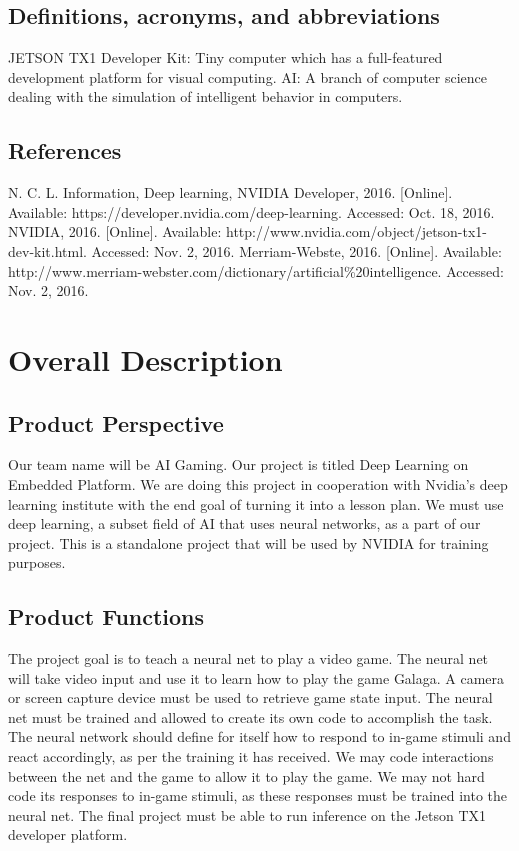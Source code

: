 \documentclass{scrreprt}
\begin{document}
\section{Definitions, acronyms, and abbreviations}
JETSON TX1 Developer Kit: Tiny computer which has a full-featured development platform for visual computing.\newline
AI: A branch of computer science dealing with the simulation of intelligent behavior in computers.\newline

\section{References}
N. C. L. Information, Deep learning, NVIDIA Developer, 2016. [Online]. Available: https://developer.nvidia.com/deep-learning. Accessed: Oct. 18, 2016.\newline
NVIDIA, 2016. [Online]. Available: http://www.nvidia.com/object/jetson-tx1-dev-kit.html. Accessed: Nov. 2, 2016.\newline
Merriam-Webste, 2016. [Online]. Available: http://www.merriam-webster.com/dictionary/artificial\%20intelligence. Accessed: Nov. 2, 2016.

\chapter{Overall Description}

\section{Product Perspective}
Our team name will be AI Gaming.
Our project is titled Deep Learning on Embedded Platform.
We are doing this project in cooperation with Nvidia's deep learning institute with the end goal of turning it into a lesson plan.
We must use deep learning, a subset field of AI that uses neural networks, as a part of our project. This is a standalone project that will be used by NVIDIA for training purposes.

\section{Product Functions}
The project goal is to teach a neural net to play a video game.
The neural net will take video input and use it to learn how to play the game Galaga.
A camera or screen capture device must be used to retrieve game state input.
The neural net must be trained and allowed to create its own code to accomplish the task.
The neural network should define for itself how to respond to in-game stimuli and react accordingly, as per the training it has received.
We may code interactions between the net and the game to allow it to play the game.
We may not hard code its responses to in-game stimuli, as these responses must be trained into the neural net.
The final project must be able to run inference on the Jetson TX1 developer platform.
\end{document}
